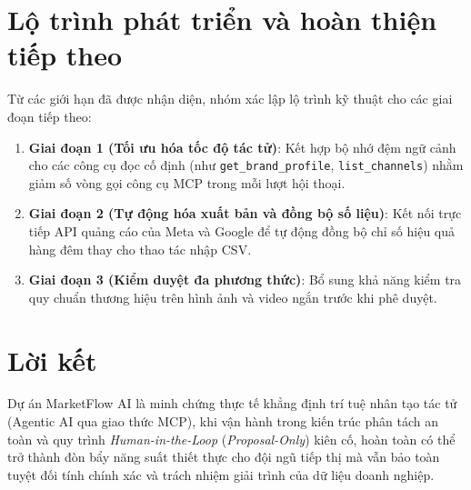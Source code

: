 \section{Lộ trình phát triển và hoàn thiện tiếp theo}

Từ các giới hạn đã được nhận diện, nhóm xác lập lộ trình kỹ thuật cho các giai đoạn tiếp theo:
\begin{enumerate}[noitemsep,topsep=2pt]
 \item \textbf{Giai đoạn 1 (Tối ưu hóa tốc độ tác tử)}: Kết hợp bộ nhớ đệm ngữ cảnh cho các công cụ đọc cố định (như \texttt{get\_brand\_profile}, \texttt{list\_channels}) nhằm giảm số vòng gọi công cụ MCP trong mỗi lượt hội thoại.
 \item \textbf{Giai đoạn 2 (Tự động hóa xuất bản và đồng bộ số liệu)}: Kết nối trực tiếp API quảng cáo của Meta và Google để tự động đồng bộ chỉ số hiệu quả hàng đêm thay cho thao tác nhập CSV.
 \item \textbf{Giai đoạn 3 (Kiểm duyệt đa phương thức)}: Bổ sung khả năng kiểm tra quy chuẩn thương hiệu trên hình ảnh và video ngắn trước khi phê duyệt.
\end{enumerate}

\section{Lời kết}

Dự án MarketFlow AI là minh chứng thực tế khẳng định trí tuệ nhân tạo tác tử (Agentic AI qua giao thức MCP), khi vận hành trong kiến trúc phân tách an toàn và quy trình \textit{Human-in-the-Loop} (\textit{Proposal-Only}) kiên cố, hoàn toàn có thể trở thành đòn bẩy năng suất thiết thực cho đội ngũ tiếp thị mà vẫn bảo toàn tuyệt đối tính chính xác và trách nhiệm giải trình của dữ liệu doanh nghiệp.
